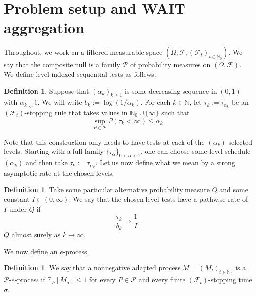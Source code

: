 \documentclass{article}
\newcommand{\EE}{\mathbb E}
\theoremstyle{definition}
\newtheorem{definition}[theorem]{Definition}
\begin{document}
\section{Problem setup and WAIT aggregation}\label{sec:warmup}

Throughout, we work on a filtered measurable space $(\Omega, \mathcal F, (\mathcal F_t)_{t\in\mathbb N_0})$. We say that the composite null is a family $\mathcal P$ of probability measures on $(\Omega, \mathcal F)$. We define level-indexed sequential tests as follows.

\begin{definition}
Suppose that $(\alpha_k)_{k\ge 1}$ is some decreasing sequence in $(0,1)$ with $\alpha_k\downarrow 0$. We will write $b_k:=\log(1/\alpha_k)$. For each $k\in\mathbb N$, let $\tau_k:=\tau_{\alpha_k}$ be an $(\mathcal F_t)$-stopping rule that takes values in $\mathbb N_0\cup\{\infty\}$ such that
\begin{equation}\label{eq:V}
\sup_{P\in\mathcal P} P(\tau_k<\infty)\le \alpha_k.
\end{equation}
\end{definition}

Note that this construction only needs to have tests at each of the $(\alpha_k)$ selected levels. Starting with a full family $\{\tau_\alpha\}_{0<\alpha<1}$, one can choose some level schedule $(\alpha_k)$ and then take $\tau_k:=\tau_{\alpha_k}$. Let us now define what we mean by a strong asymptotic rate at the chosen levels.

\begin{definition}
Take some particular alternative probability measure $Q$ and some constant $I\in(0,\infty)$. We say that the chosen level tests have a pathwise rate of $I$ under $Q$ if
\begin{equation}\label{eq:AO}
\frac{\tau_k}{b_k}\longrightarrow \frac{1}{I},
\end{equation}
$Q$ almost surely as $k\to\infty$.    
\end{definition}

We now define an $e$-process. 

\begin{definition}
We say that a nonnegative adapted process $M=(M_t)_{t\in\mathbb N_0}$ is a $\mathcal P$-$e$-process if $\EE_P[M_\sigma]\le 1$ for every $P\in\mathcal P$ and every finite $(\mathcal F_t)$-stopping time $\sigma$.
\end{definition}
\end{document}
